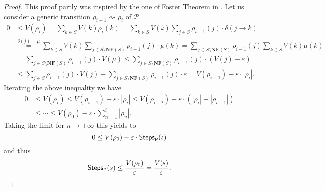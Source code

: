 \begin{LONG}
	\begin{proof}
		This proof partly was inspired by the one of Foster Theorem in \cite{bremaud_markov_1999}. Let us consider a generic transition $\rho_{i-1}\rightsquigarrow\rho_i$ of $\mathcal{P}$.
		\begin{equation*}
		\begin{split}
		0&\leq V(\rho_i)=\sum_{k\in S}V(k)\rho_i(k)=\sum_{k\in S}V(k)\sum_{j\in S}\rho_{i-1}(j)\cdot\delta(j\rightarrow k)\\
		&\overset{\delta(j)=\mu}{=}\sum_{k\in S}V(k)\sum_{j\in S\setminus \mathbf{NF}(S)}\rho_{i-1}(j)\cdot\mu(k)=\sum_{j\in S\setminus \mathbf{NF}(S)}\rho_{i-1}(j)\sum_{k\in S}V(k)\mu(k)\\
		&=\sum_{j\in S\setminus \mathbf{NF}(S)}\rho_{i-1}(j)\cdot V(\mu)\leq \sum_{j\in S\setminus \mathbf{NF}(S)}\rho_{i-1}(j)\cdot (V(j)-\varepsilon)\\
		&\leq \sum_{j\in S}\rho_{i-1}(j)\cdot V(j) - \sum_{j\in S\setminus \mathbf{NF}(S)}\rho_{i-1}(j)\cdot \varepsilon=V(\rho_{i-1})-\varepsilon\cdot|\rho_i|.
		\end{split}
		\end{equation*}
		Iterating the above inequality we have
		\begin{align*}
		0&\leq V(\rho_i)\leq V(\rho_{i-1})-\varepsilon\cdot|\rho_i|\leq V(\rho_{i-2})-\varepsilon\cdot(|\rho_i| + |\rho_{i-1}|)\\
		&\leq \cdots\leq V(\rho_0)-\varepsilon\cdot\sum_{n=1}^i |\rho_n|.
		\end{align*}
		Taking the limit for $n\rightarrow +\infty$ this yields to
		$$
		0\leq V(\rho_0)-\varepsilon\cdot\textsf{Steps}_{\mathsf{P}}(s)
		$$
		and thus
		$$
		\textsf{Steps}_{\mathsf{P}}(s)\leq \frac{V(\rho_0)}{\varepsilon}=\frac{V(s)}{\varepsilon}.
		$$
		
	\end{proof}
\end{LONG}
